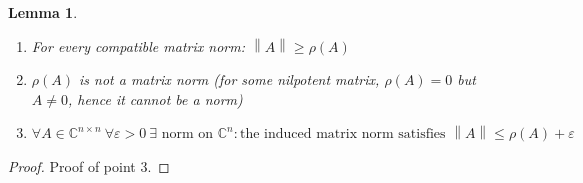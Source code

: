 \documentclass{article}
\newcounter{lecref}[section]
\numberwithin{lecref}{section}
\newtheorem{lemma}[lecref]{Lemma}
\newcommand{\norm}[1]{\left\|#1\right\|}
\begin{document}
\begin{lemma} %
  \begin{enumerate}
    \item For every compatible matrix norm: $\norm{A} \geq \rho(A)$
    \item $\rho(A)$ is not a matrix norm (for some nilpotent matrix, $\rho(A) = 0$ but $A \neq 0$, hence it cannot be a norm)
    \item $\forall A \in \mathbb C^{n \times n} \: \forall \varepsilon > 0 \:\exists \text{ norm on } \mathbb C^n: \text{the induced matrix norm satisfies } \norm{A} \leq \rho(A) + \varepsilon$
  \end{enumerate}
\end{lemma}

\begin{proof}
  Proof of point 3.


\end{proof}
\end{document}
